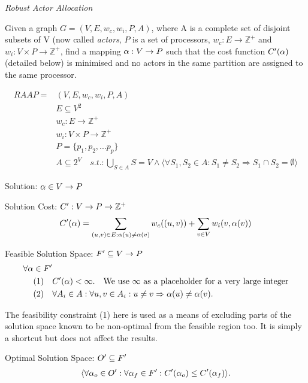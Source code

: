 \begin{definition}
\label{defHardRAAP}
{\em Robust Actor Allocation}

Given a graph $G=(V,E,w_c,w_i, P, A)$, where A is a complete set of disjoint subsets of V (now called {\em actors}, $P$ is a set of processors, $w_c : E \rightarrow \mathbb{Z}^+$ and $w_i : V \times P \rightarrow \mathbb{Z}^+$, find a mapping $\alpha : V \rightarrow P$ such that
the cost function $C'(\alpha)$ (detailed below) is minimised and no actors in the same partition are assigned to the same processor.

\begin{align}
	\nonumber RAAP = & (V,E,w_c, w_i, P, A)\\
	\nonumber & E \subseteq V^2\\
	\nonumber & w_c : E \rightarrow \mathbb{Z}^+\\
	\nonumber & w_i : V \times P \rightarrow \mathbb{Z}^+\\
	\nonumber & P = \{p_1, p_2, ...p_p\} \\
	\nonumber & A \subseteq 2^V \quad s.t. : \displaystyle\bigcup\limits_{S \in A} S = V \wedge \langle \forall S_1, S_2 \in A : S_1 \neq S_2 \Rightarrow S_1 \cap S_2 = \emptyset \rangle
\end{align}

Solution: $\alpha \in V \rightarrow P$

Solution Cost: $C' : V \rightarrow P \rightarrow \mathbb{Z}^+$
\begin{align}
	\nonumber C'(\alpha) = \displaystyle\sum\limits_{(u,v) \in E : \alpha(u) \neq \alpha(v)} w_c((u,v)) + \displaystyle\sum\limits_{v \in V} w_i(v, \alpha(v))
\end{align}

Feasible Solution Space: $F' \subseteq V \rightarrow P$
\begin{align}
	\nonumber \forall \alpha \in F' & \\
	\nonumber \mbox{(1)} \quad & C'(\alpha) < \infty . \quad \mbox{We use $\infty$ as a placeholder for a very large integer} \\
	\nonumber \mbox{(2)} \quad & \forall A_i \in A : \forall u , v \in A_i : u \neq v \Rightarrow \alpha(u) \neq  \alpha(v) .
\end{align}

\noindent The feasibility constraint (1) here is used as a means of excluding parts of the solution space known to be non-optimal from the feasible region too.
It is simply a shortcut but does not affect the results.

Optimal Solution Space: $O' \subseteq F'$
\begin{align}
	\nonumber \langle \forall \alpha_o \in O' : \forall \alpha_f \in F' : C'(\alpha_o) \leq C'(\alpha_f) \rangle .
\end{align}

\end{definition}

